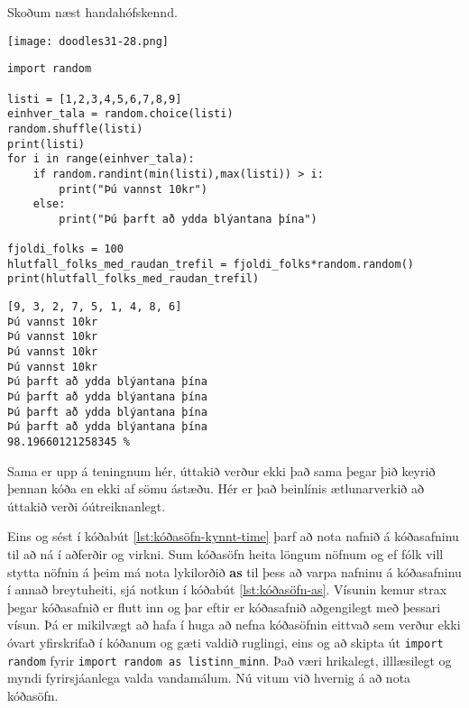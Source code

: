 Skoðum næst handahófskennd.

\phantom{easter egg}
\begin{center}
	\texttt{[image: doodles31-28.png]}
\end{center}
\phantom{}

\begin{lstlisting}[caption=Notkun kóðasafna með random, label=lst:kóðasöfn-kynnt-rand]
import random

listi = [1,2,3,4,5,6,7,8,9]
einhver_tala = random.choice(listi)
random.shuffle(listi)
print(listi)
for i in range(einhver_tala):
	if random.randint(min(listi),max(listi)) > i:
		print("Þú vannst 10kr")
	else:
		print("Þú þarft að ydda blýantana þína")

fjoldi_folks = 100
hlutfall_folks_med_raudan_trefil = fjoldi_folks*random.random()
print(hlutfall_folks_med_raudan_trefil)
\end{lstlisting}
\lstset{style=uttak}
\begin{lstlisting}
[9, 3, 2, 7, 5, 1, 4, 8, 6]
Þú vannst 10kr
Þú vannst 10kr
Þú vannst 10kr
Þú vannst 10kr
Þú þarft að ydda blýantana þína
Þú þarft að ydda blýantana þína
Þú þarft að ydda blýantana þína
Þú þarft að ydda blýantana þína
98.19660121258345 %
\end{lstlisting}
\lstset{style=venjulegt}

Sama er upp á teningnum hér, úttakið verður ekki það sama þegar þið keyrið þennan kóða en ekki af sömu ástæðu.
Hér er það beinlínis ætlunarverkið að úttakið verði óútreiknanlegt.



Eins og sést í kóðabút \ref{lst:kóðasöfn-kynnt-time} þarf að nota nafnið á kóðasafninu til að ná í aðferðir og virkni.
Sum kóðasöfn heita löngum nöfnum og ef fólk vill stytta nöfnin á þeim má nota lykilorðið \textbf{as} til þess að varpa nafninu á kóðasafninu í annað breytuheiti, sjá notkun í kóðabút \ref{lst:kóðasöfn-as}.
Vísunin kemur strax þegar kóðasafnið er flutt inn og þar eftir er kóðasafnið aðgengilegt með þessari vísun.
Þá er mikilvægt að hafa í huga að nefna kóðasöfnin eittvað sem verður ekki óvart yfirskrifað í kóðanum og gæti valdið ruglingi, eins og að skipta út \texttt{import random} fyrir \texttt{import random as listinn\_minn}.
Það væri hrikalegt, illlæsilegt og myndi fyrirsjáanlega valda vandamálum.
Nú vitum við hvernig á að nota kóðasöfn.

